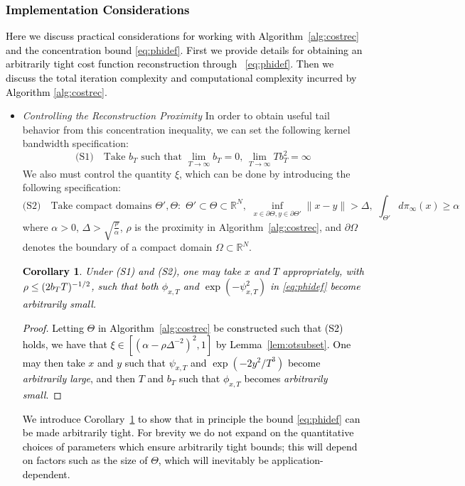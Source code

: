\documentclass[journal,onecolumn]{IEEEtran}
\newtheorem{corollary}{Corollary}
\newcommand{\reals}{\mathbb{R}}
\newcommand{\dimn}{N}
\newcommand{\gibbs}{\ids_{\infty}}
\newcommand{\del}{\partial}
\newcommand{\ids}{\pi}
\newcommand{\wassprox}{\rho}
\newcommand{\kfv}{x} %
\newcommand{\zconst}{\xi}
\newcommand{\snum}{T}
\begin{document}
\textcolor{black}{\subsubsection{Implementation Considerations}
\label{sec:impcon}
Here we discuss practical considerations for working with Algorithm~\ref{alg:costrec} and the concentration bound \eqref{eq:phidef}. First we provide details for obtaining an arbitrarily tight cost function reconstruction through ~\eqref{eq:phidef}. Then we discuss the total iteration complexity and computational complexity incurred by Algorithm \ref{alg:costrec}.}
\begin{itemize}
\item[-] \textit{Controlling the Reconstruction Proximity} In order to obtain useful tail behavior from this concentration inequality, we can set the following kernel bandwidth specification: 
\[\textrm{(S1)} \quad \textrm{Take } b_T \textrm{ such that }  \lim_{T\to\infty}b_T = 0,\, \lim_{T\to\infty}Tb_T^2 = \infty\]
We also must control the quantity $\zconst$, which can be done by introducing the following specification: 
\[\textrm{(S2)}\quad \textrm{Take compact domains }\Theta',\Theta : \,\, \Theta' \subset \Theta \subset \reals^{\dimn}, \,\, \inf_{x\in\del\Theta,y\in\del\Theta'}\|x-y\| > \Delta, \,\, \int_{\Theta'}d\gibbs(x) \geq \alpha\] where $\alpha>0$, $\Delta > \sqrt{\frac{\rho}{\alpha}}$, $\rho$ is the proximity in Algorithm~\ref{alg:costrec}, and $\del\Omega$ denotes the boundary of a compact domain $\Omega\subset\reals^{\dimn}$. \textcolor{black}{
\begin{corollary}
\label{cor:tight}
    Under (S1) and (S2), one may take $\kfv$ and $T$ appropriately, with $\wassprox \leq (2 b_T {\color{black}\snum })^{-1/2}$, such that both $\phi_{\kfv,T}$ and $\exp(-\psi^2_{\kfv,T})$ in \eqref{eq:phidef} become arbitrarily small.
\end{corollary}
\begin{proof}
Letting $\Theta$ in Algorithm~\ref{alg:costrec} be constructed such that (S2) holds, we have that $\zconst \in \left[(\alpha - \rho\Delta^{-2})^2,1\right]$ by Lemma~\ref{lem:otsubset}. One may then take $x$ and $y$ such that $\psi_{x,T}$ and $\exp(-2y^2/T^3)$ become \textit{arbitrarily large}, and then $T$ and $b_T$ such that $\phi_{x,T}$ becomes \textit{arbitrarily small}.
\end{proof}}
\textcolor{black}{We introduce Corollary~\ref{cor:tight} to show that in principle the bound \eqref{eq:phidef} can be made arbitrarily tight. For brevity we do not expand on the quantitative choices of parameters which ensure arbitrarily tight bounds; this will depend on factors such as the size of $\Theta$, which will inevitably be application-dependent.}


\end{itemize}
\end{document}
